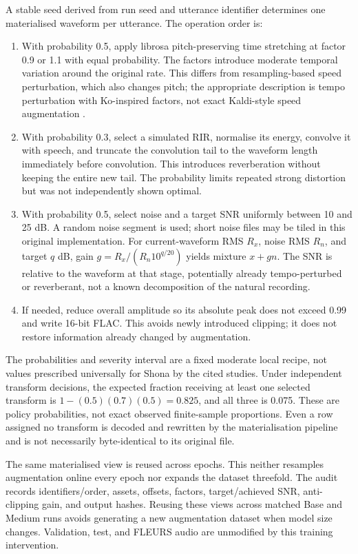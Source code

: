 \documentclass[12pt,a4paper]{report}
\begin{document}
A stable seed derived from run seed and utterance identifier determines one materialised waveform per utterance. The operation order is:
\begin{enumerate}
\item With probability 0.5, apply librosa pitch-preserving time stretching at factor 0.9 or 1.1 with equal probability. The factors introduce moderate temporal variation around the original rate. This differs from resampling-based speed perturbation, which also changes pitch; the appropriate description is tempo perturbation with Ko-inspired factors, not exact Kaldi-style speed augmentation \citep{Ko2015}.
\item With probability 0.3, select a simulated RIR, normalise its energy, convolve it with speech, and truncate the convolution tail to the waveform length immediately before convolution. This introduces reverberation without keeping the entire new tail. The probability limits repeated strong distortion but was not independently shown optimal.
\item With probability 0.5, select noise and a target SNR uniformly between 10 and 25 dB. A random noise segment is used; short noise files may be tiled in this original implementation. For current-waveform RMS $R_x$, noise RMS $R_n$, and target $q$ dB, gain $g=R_x/(R_n10^{q/20})$ yields mixture $x+gn$. The SNR is relative to the waveform at that stage, potentially already tempo-perturbed or reverberant, not a known decomposition of the natural recording.
\item If needed, reduce overall amplitude so its absolute peak does not exceed 0.99 and write 16-bit FLAC. This avoids newly introduced clipping; it does not restore information already changed by augmentation.
\end{enumerate}

The probabilities and severity interval are a fixed moderate local recipe, not values prescribed universally for Shona by the cited studies. Under independent transform decisions, the expected fraction receiving at least one selected transform is $1-(0.5)(0.7)(0.5)=0.825$, and all three is 0.075. These are policy probabilities, not exact observed finite-sample proportions. Even a row assigned no transform is decoded and rewritten by the materialisation pipeline and is not necessarily byte-identical to its original file.

The same materialised view is reused across epochs. This neither resamples augmentation online every epoch nor expands the dataset threefold. The audit records identifiers/order, assets, offsets, factors, target/achieved SNR, anti-clipping gain, and output hashes. Reusing these views across matched Base and Medium runs avoids generating a new augmentation dataset when model size changes. Validation, test, and FLEURS audio are unmodified by this training intervention.
\end{document}

